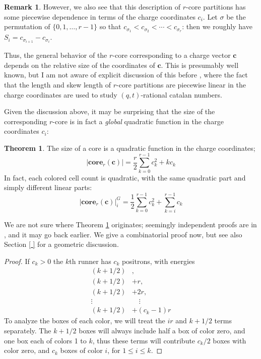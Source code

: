 \documentclass{amsart}[12pt]
\theoremstyle{definition}
\newtheorem{theorem}[dummy]{Theorem}
\newtheorem{remark}[dummy]{Remark}
\newcommand{\core}{\mathbf{core}}
\begin{document}
\begin{remark}
However, we also see that this description of $r$-core partitions has some piecewise dependence in terms of the charge coordinates $c_i$.  Let $\sigma$ be the permutation of $\{0,1,\dots,r-1\}$ so that $c_{\sigma_1}<c_{\sigma_2}<\cdots < c_{\sigma_r}$: then we roughly have $S_i=c_{\sigma_{i+1}}-c_{\sigma_i}$.

Thus, the general behavior of the $r$-core corresponding to a charge vector $\mathbf{c}$ depends on the relative size of the coordinates of $\mathbf{c}$.  This is presumably well known, but I am not aware of explicit discussion of this before \cite{jsimultaneous}, where the fact that the length and skew length of $r$-core partitions are piecewise linear in the charge coordinates are used to study $(q,t)$-rational catalan numbers.





Given the discussion above, it may be surprising that the size of the corresponding $r$-core is in fact a \emph{global} quadratic function in the charge coordinates $c_i$:




\begin{theorem} \label{thm:quadratic-sl2}
The size of a core is a quadratic function in the charge coordinates;
$$|\core_r(\mathbf{c})|=\frac{r}{2}\sum_{k=0}^{r-1} c_k^2+ kc_k$$
In fact, each colored cell count is quadratic, with the same quadratic part and simply different linear parts:  
$$|\core_r(\mathbf{c})|^G_i=\frac{1}{2}\sum_{k=0}^{r-1} c_k^2+ \sum^{r-1}_{k=i}c_k$$
\end{theorem}

We are not sure where Theorem \ref{thm:quadratic-sl2} originates; seemingly independent proofs are in \cite{GKS, DS}, and it may go back earlier.  We give a combinatorial proof now, but see also Section \ref{ } for a geometric discussion.

\begin{proof}
 If  $c_k>0$ the $k$th runner has $c_k$ positrons, with
 energies 
\begin{align*}
(k+1/2)&,\\
(k+1/2)&+r, \\
(k+1/2)&+2r,\\
\vdots\quad &\quad \vdots \\
 (k+1/2)&+(c_k-1)r
\end{align*}
To analyze the boxes of each color, we will treat the $ir$ and $k+1/2$ terms separately.  The $k+1/2$ boxes will always include half a box of color zero, and one box each of colors 1 to $k$, thus these terms will contribute $c_k/2$ boxes with color zero, and $c_k$ boxes of color $i$, for $1\leq i\leq k$.  


\end{proof}
\end{remark}
\end{document}
